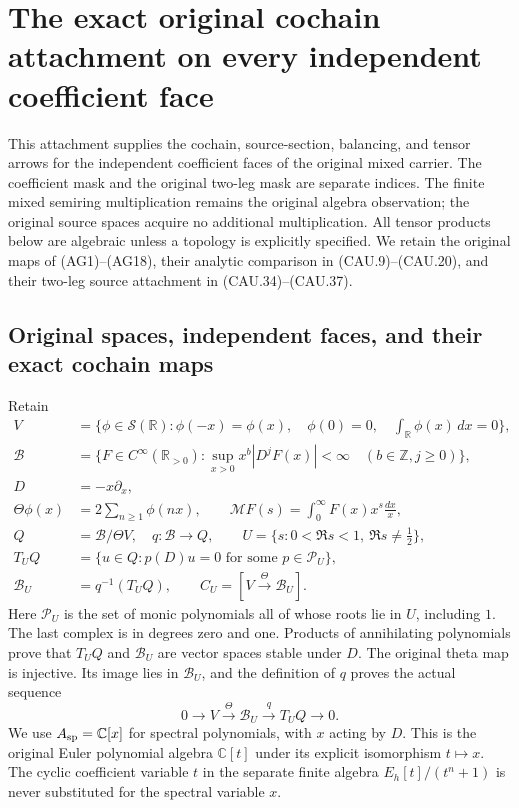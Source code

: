 \section{The exact original cochain attachment on every independent coefficient face}
\label{CFStage:sec:coefficient-face-cochain-attachment}

This attachment supplies the cochain, source-section, balancing, and tensor
arrows for the independent coefficient faces of the original mixed carrier.
The coefficient mask and the original two-leg mask are separate indices.
The finite mixed semiring multiplication remains the original algebra
observation; the original source spaces acquire no additional multiplication.
All tensor products below are algebraic unless a topology is explicitly
specified.  We retain the original maps of (AG1)--(AG18), their analytic
comparison in (CAU.9)--(CAU.20), and their two-leg source attachment in
(CAU.34)--(CAU.37).

\subsection{Original spaces, independent faces, and their exact cochain maps}

Retain
\[
\begin{split}
 V&=\{\phi\in\mathcal S(\mathbb R):\phi(-x)=\phi(x),\quad
       \phi(0)=0,\quad\textstyle\int_{\mathbb R}\phi(x)\,dx=0\},\\
 \mathscr B&=\{F\in C^\infty(\mathbb R_{>0}):
       \sup_{x>0}x^b|D^jF(x)|<\infty\quad(b\in\mathbb Z,j\ge0)\},\\
 D&=-x\partial_x,\\
 \Theta\phi(x)&=2\sum_{n\ge1}\phi(nx),\qquad
 \mathcal MF(s)=\int_0^\infty F(x)x^s\frac{dx}{x},\\
 Q&=\mathscr B/\Theta V,\quad q:\mathscr B\to Q,\qquad
 U=\{s:0<\Re s<1,\ \Re s\ne\tfrac12\},\\
 T_UQ&=\{u\in Q:p(D)u=0\text{ for some }p\in\mathcal P_U\},\\
 \mathscr B_U&=q^{-1}(T_UQ),\qquad C_U=[V\xrightarrow{\Theta}\mathscr B_U].
\end{split}                                                     \tag{CFA.1}
\]
Here $\mathcal P_U$ is the set of monic polynomials all of whose roots
lie in $U$, including $1$.  The last complex is in degrees zero and one.
Products of annihilating polynomials prove that $T_UQ$ and
$\mathscr B_U$ are vector spaces stable under $D$.  The original
theta map is injective.  Its image lies in $\mathscr B_U$, and the
definition of $q$ proves the actual sequence
\[
 0\longrightarrow V\xrightarrow{\Theta}\mathscr B_U
           \xrightarrow{q}T_UQ\longrightarrow0.                \tag{CFA.2}
\]
We use $A_{\rm sp}=\mathbb C[x]$ for spectral polynomials, with $x$
acting by $D$.  This is the original Euler polynomial algebra
$\mathbb C[t]$ under its explicit isomorphism $t\mapsto x$.
The cyclic coefficient variable $t$ in the separate finite algebra
$E_h[t]/(t^n+1)$ is never substituted for the spectral variable $x$.

